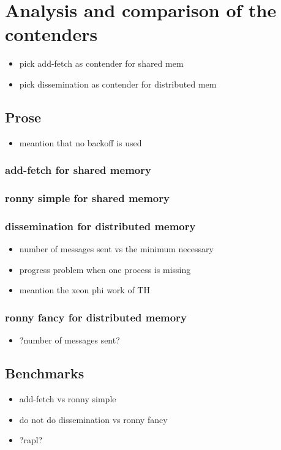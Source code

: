 \documentclass[a4paper, 10pt]{article}
\begin{document}
\section{Analysis and comparison of the contenders}

\begin{itemize}
	\item pick add-fetch as contender for shared mem
	\item pick dissemination as contender for distributed mem
\end{itemize}

\subsection{Prose}
\begin{itemize}
	\item meantion that no backoff is used
\end{itemize}

\subsubsection{add-fetch for shared memory}
\subsubsection{ronny simple for shared memory}
\subsubsection{dissemination for distributed memory}
\begin{itemize}
	\item number of messages sent vs the minimum necessary
	\item progress problem when one process is missing
	\item meantion the xeon phi work of TH
\end{itemize}
\subsubsection{ronny fancy for distributed memory}
\begin{itemize}
	\item ?number of messages sent?
\end{itemize}

\subsection{Benchmarks}
\begin{itemize}
	\item add-fetch vs ronny simple
	\item do not do dissemination vs ronny fancy
	\item ?rapl?
\end{itemize}
\end{document}
